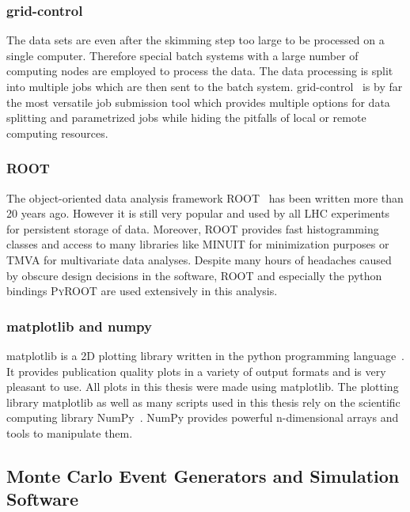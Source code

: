 \subsubsection{grid-control}

The data sets are even after the skimming step too large to be processed on a
single computer. Therefore special batch systems with a large number of
computing nodes are employed to process the data. The data processing is split
into multiple jobs which are then sent to the batch system.
grid-control~\cite{Gridcontrol:2015aa} is by far the most versatile job
submission tool which provides multiple options for data splitting and
parametrized jobs while hiding the pitfalls of local or remote computing
resources.

\subsubsection{ROOT}

The object-oriented data analysis framework ROOT~\cite{Brun:1997pa} has been
written more than 20 years ago. However it is still very popular and used by all
LHC experiments for persistent storage of data. Moreover, ROOT provides fast
histogramming classes and access to many libraries like MINUIT for minimization
purposes or TMVA for multivariate data analyses. Despite many hours of headaches
caused by obscure design decisions in the software, ROOT and especially the
python bindings \textsc{PyROOT} are used extensively in this analysis.

\subsubsection{matplotlib and numpy}

matplotlib is a 2D plotting library written in the python programming language~\cite{Hunter:2007aa}. It
provides publication quality plots in a variety of output formats and is very
pleasant to use. All plots in this thesis were made using matplotlib. The
plotting library matplotlib as well as many scripts used in this thesis rely on
the scientific computing library NumPy~\cite{Oliphant:2007aa}. NumPy provides
powerful n-dimensional arrays and tools to manipulate them. 

\subsection{Monte Carlo Event Generators and Simulation Software}
\label{subsection:mc_generators}

